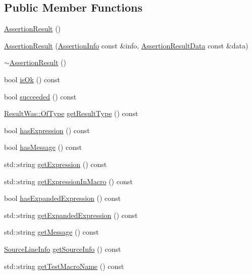 \subsection*{Public Member Functions}
\begin{DoxyCompactItemize}
\item 
\hyperlink{class_catch_1_1_assertion_result_a570b999c5f66e33cb31d3adb29fec25b}{Assertion\+Result} ()
\item 
\hyperlink{class_catch_1_1_assertion_result_ab58aeec27052ba400633ed0e36cea692}{Assertion\+Result} (\hyperlink{struct_catch_1_1_assertion_info}{Assertion\+Info} const \&info, \hyperlink{struct_catch_1_1_assertion_result_data}{Assertion\+Result\+Data} const \&data)
\item 
\hyperlink{class_catch_1_1_assertion_result_abf90f5abd04d38b2fb4f5d575bdc4f1e}{$\sim$\+Assertion\+Result} ()
\item 
bool \hyperlink{class_catch_1_1_assertion_result_ae39658b71c4afc3c8a859043b0e97027}{is\+Ok} () const
\item 
bool \hyperlink{class_catch_1_1_assertion_result_ac5cc872b721d5fb65d87221d30b22fdd}{succeeded} () const
\item 
\hyperlink{struct_catch_1_1_result_was_a624e1ee3661fcf6094ceef1f654601ef}{Result\+Was\+::\+Of\+Type} \hyperlink{class_catch_1_1_assertion_result_ac810750194e1722489d2fd16e8c6a4a8}{get\+Result\+Type} () const
\item 
bool \hyperlink{class_catch_1_1_assertion_result_aba37b4fef1015989df2136592958e984}{has\+Expression} () const
\item 
bool \hyperlink{class_catch_1_1_assertion_result_aae37064b401919fa8ac480ef86cca924}{has\+Message} () const
\item 
std\+::string \hyperlink{class_catch_1_1_assertion_result_a26a777f3959353c729544cb2ace0d279}{get\+Expression} () const
\item 
std\+::string \hyperlink{class_catch_1_1_assertion_result_aac35a0ca42d33bff6467c76573730f5e}{get\+Expression\+In\+Macro} () const
\item 
bool \hyperlink{class_catch_1_1_assertion_result_a78c43506c2b3d8cc1fb141a97d09ec94}{has\+Expanded\+Expression} () const
\item 
std\+::string \hyperlink{class_catch_1_1_assertion_result_aaa46070791a6c07caaed86229b8d9d75}{get\+Expanded\+Expression} () const
\item 
std\+::string \hyperlink{class_catch_1_1_assertion_result_ae730943beed46921b09383c673e35786}{get\+Message} () const
\item 
\hyperlink{struct_catch_1_1_source_line_info}{Source\+Line\+Info} \hyperlink{class_catch_1_1_assertion_result_aa4d3fdbfe276a69a035762dbb790800f}{get\+Source\+Info} () const
\item 
std\+::string \hyperlink{class_catch_1_1_assertion_result_aaefd9a0384282fd08a4a72aa19bd0628}{get\+Test\+Macro\+Name} () const
\end{DoxyCompactItemize}
